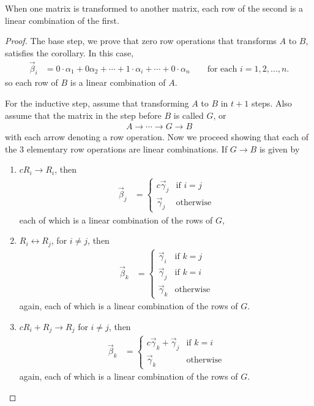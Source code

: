 \begin{corollary} \label{cor:rows:linear:comb}
When one matrix is transformed to another matrix, each row of the second is a linear combination of the first.
\end{corollary}

\begin{proof}
The base step, we prove that zero row operations that transforms $A$ to $B$, satisfies the corollary. In this case,
%
\begin{align*}
\vec{\beta}_i & = 0 \cdot \alpha_1+ 0 \alpha_2 + \cdots + 1 \cdot \alpha_i + \cdots + 0 \cdot \alpha_n \qquad \text{for each $i=1, 2, \ldots, n$}.
\end{align*}
so each row of $B$ is a linear combination of $A$.

For the inductive step, assume that transforming $A$ to $B$ in $t+1$ steps.  Also assume that the matrix in the step before $B$ is called $G$, or
%
\begin{align*}
A \rightarrow \cdots \rightarrow G \rightarrow B
\end{align*}
with each arrow denoting a row operation.  Now we proceed showing that each of the 3 elementary row operations are linear combinations.   If $G \rightarrow B$ is given by

\begin{enumerate}[label=(\roman*)]
\item $c R_i \rightarrow R_i$, then
%
\begin{align*}
\vec{\beta}_j & = \begin{cases}
c \vec{\gamma}_j & \text{if $i=j$} \\
\vec{\gamma}_j & \text{otherwise}
\end{cases}
\end{align*}
each of which is a linear combination of the rows of $G$,
\item $R_i \leftrightarrow R_j$, for $i \neq j$, then
%
\begin{align*}
\vec{\beta}_k  & = \begin{cases}
\vec{\gamma}_i & \text{if $k=j$} \\
\vec{\gamma}_j & \text{if $k=i$} \\
\vec{\gamma}_k & \text{otherwise}
\end{cases}
\end{align*}
again, each of which is a linear combination of the rows of $G$.

\item $c R_i + R_j \rightarrow R_j$ for $i \neq j$, then
\begin{align*}
\vec{\beta}_k  & = \begin{cases}
c \vec{\gamma}_k+ \vec{\gamma}_j & \text{if $k=i$} \\
\vec{\gamma}_k & \text{otherwise}
\end{cases}
\end{align*}
again, each of which is a linear combination of the rows of $G$.



\end{enumerate}
\end{proof}
